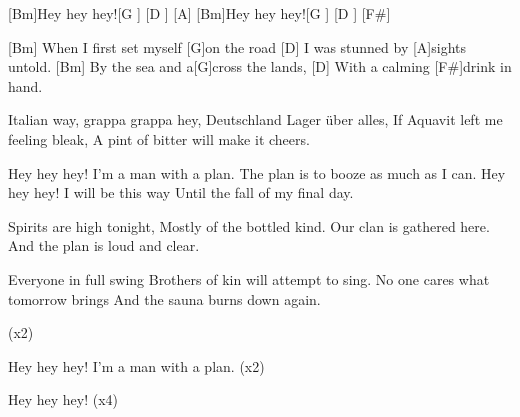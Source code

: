 

\begin{guitar}
	
	[Bm]Hey hey hey![G ] [D ] [A]{}
	[Bm]Hey hey hey![G ] [D ] [F#]{}
	
	[Bm] When I first set myself [G]on the road
	[D] I was stunned by [A]sights untold.
	[Bm] By the sea and a[G]cross the lands,
	[D] With a calming [F#]drink in hand.
	
	Italian way, grappa grappa hey,
	Deutschland Lager über alles,
	If Aquavit left me feeling bleak,
	A pint of bitter will make it cheers.
	
	Hey hey hey! I'm a man with a plan.
	The plan is to booze as much as I can.
	Hey hey hey! I will be this way
	Until the fall of my final day.
	
	
	Spirits are high tonight,
	Mostly of the bottled kind.
	Our clan is gathered here.
	And the plan is loud and clear.
	
	Everyone in full swing
	Brothers of kin will attempt to sing.
	No one cares what tomorrow brings
	And the sauna burns down again.
	
	  (x2)
	
	Hey hey hey! I'm a man with a plan. (x2)
	
	Hey hey hey! (x4)
\end{guitar}